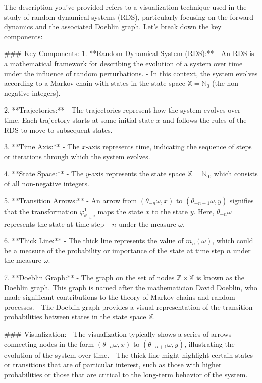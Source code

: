 The description you've provided refers to a visualization technique used in the study of random dynamical systems (RDS), particularly focusing on the forward dynamics and the associated Doeblin graph. Let's break down the key components:

### Key Components:
1. **Random Dynamical System (RDS):**
   - An RDS is a mathematical framework for describing the evolution of a system over time under the influence of random perturbations.
   - In this context, the system evolves according to a Markov chain with states in the state space \(\mathds{X} = \mathds{N}_0\) (the non-negative integers).

2. **Trajectories:**
   - The trajectories represent how the system evolves over time. Each trajectory starts at some initial state \(x\) and follows the rules of the RDS to move to subsequent states.

3. **Time Axis:**
   - The \(x\)-axis represents time, indicating the sequence of steps or iterations through which the system evolves.

4. **State Space:**
   - The \(y\)-axis represents the state space \(\mathds{X} = \mathds{N}_0\), which consists of all non-negative integers.

5. **Transition Arrows:**
   - An arrow from \((\theta_{-n} \omega, x)\) to \((\theta_{-n+1} \omega, y)\) signifies that the transformation \(\varphi_{\theta_{-n}\omega}^1\) maps the state \(x\) to the state \(y\). Here, \(\theta_{-n}\omega\) represents the state at time step \(-n\) under the measure \(\omega\).

6. **Thick Line:**
   - The thick line represents the value of \(m_n(\omega)\), which could be a measure of the probability or importance of the state at time step \(n\) under the measure \(\omega\).

7. **Doeblin Graph:**
   - The graph on the set of nodes \(\mathds{Z} \times \mathds{X}\) is known as the Doeblin graph. This graph is named after the mathematician David Doeblin, who made significant contributions to the theory of Markov chains and random processes.
   - The Doeblin graph provides a visual representation of the transition probabilities between states in the state space \(\mathds{X}\).

### Visualization:
- The visualization typically shows a series of arrows connecting nodes in the form \((\theta_{-n} \omega, x)\) to \((\theta_{-n+1} \omega, y)\), illustrating the evolution of the system over time.
- The thick line might highlight certain states or transitions that are of particular interest, such as those with higher probabilities or those that are critical to the long-term behavior of the system.

